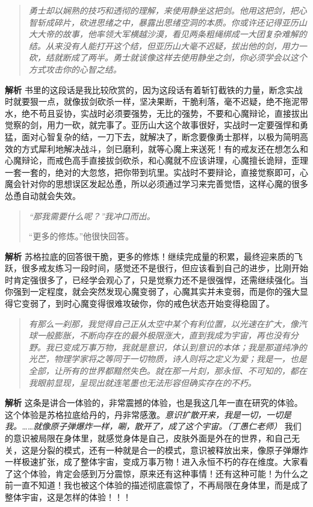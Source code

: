 \begin{quote}\it
    勇士却以娴熟的技巧和透彻的理解，来使用静坐这把剑。他用这把剑，把心智斩成碎片，砍进思绪之中，暴露出思绪空洞的本质。你或许还记得亚历山大大帝的故事，他率领大军横越沙漠，看见两条粗绳绑成一大团复杂难解的结。从来没有人能打开这个结，但亚历山大毫不迟疑，拔出他的剑，用力一砍，结就断成了两半。勇士就该像这样去使用静坐之剑，你必须学会以这个方式攻击你的心智之结。
\end{quote}

\textbf{解析} 书里的这段话是我比较欣赏的，因为这段话有着斩钉截铁的力量，断念实战时就要狠一点，就像拔剑砍杀一样，坚决果断，干脆利落，毫不迟疑，绝不拖泥带水，绝不苟且妥协，实战时必须要强势，无比的强势，不要和心魔辩论，直接拔出觉察的剑，用力一砍，就完事了。亚历山大这个故事很好，实战时一定要强悍和勇猛，面对心智复杂的结，一刀下去，就解决了，断念要像勇士那样，以极为简明高效的方式犀利地解决战斗，剑已磨利，就等心魔上来送死！有的戒友还在想怎么和心魔辩论，而戒色高手直接拔剑砍杀，和心魔就不应该讲理，心魔擅长诡辩，歪理一套一套的，绝对的大忽悠，把你带到坑里。实战时不要辩论，直接觉察即可，心魔会针对你的思想误区发起怂恿，所以必须通过学习来完善觉悟，这样心魔的很多怂恿自动就会失效。

\begin{quotation}\it
    “那我需要什么呢？”我冲口而出。

    “更多的修炼。”他很快回答。
\end{quotation}

\textbf{解析} 苏格拉底的回答很干脆，更多的修炼！继续完成量的积累，最终迎来质的飞跃，很多戒友练习一段时间，感觉还不是很行，但应该看到自己的进步，比刚开始时肯定强很多了，已经学会观心了，只是觉察力还不是很强悍，还需继续强化。当你强到一定程度，就会突然发现心魔变弱了，心魔其实并未变弱，而是你的强大显得它变弱了，到时心魔变得很难攻破你，你的戒色状态开始变得稳固了。

\begin{quote}\it
    有那么一刹那，我觉得自己正从太空中某个有利位置，以光速在扩大，像汽球一般膨胀，不断向存在的最外极限涨大，直到我成为宇宙，再也没有分野。我已变成万事万物，我就是意识，体认到意识的本体；我是那道纯净的光芒，物理学家将之等同于一切物质，诗人则将之定义为爱；我是一，也是全部，让所有的世界都黯然失色。就在那一片刻，那永恒、不可知的，都在我眼前显现，呈现出就连笔墨也无法形容但确实存在的不朽。
\end{quote}

\textbf{解析} 这条是讲合一体验的，非常震撼的体验，也是我这几年一直在研究的体验。这个体验是苏格拉底给丹的，丹非常感激。\textit{意识扩散开来，我是一切，一切是我。……就像原子弹爆炸一样，唰，散开了，成了这个宇宙。（丁愚仁老师）} 我们的意识被局限在身体里，就感觉身体是自己，皮肤外面是外在的世界，和自己无关，这是分裂的模式，还有一种就是合一的模式，意识被释放出来，像原子弹爆炸一样极速扩张，成了整体宇宙，变成万事万物！进入永恒不朽的存在维度。大家看了这个体验，肯定会感到万分震惊，原来还有这种事情！还有这种可能！为什么之前一直不知道！我也被这个体验的描述彻底震惊了，不再局限在身体里，而是成了整体宇宙，这是怎样的体验！！！


